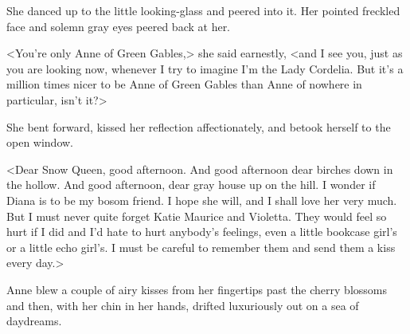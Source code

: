 She danced up to the little looking-glass and peered into it. Her pointed freckled face and solemn gray eyes peered back at her.

<You're only Anne of Green Gables,> she said earnestly, <and I see you, just as you are looking now, whenever I try to imagine I'm the Lady Cordelia. But it's a million times nicer to be Anne of Green Gables than Anne of nowhere in particular, isn't it?>

She bent forward, kissed her reflection affectionately, and betook herself to the open window.

<Dear Snow Queen, good afternoon. And good afternoon dear birches down in the hollow. And good afternoon, dear gray house up on the hill. I wonder if Diana is to be my bosom friend. I hope she will, and I shall love her very much. But I must never quite forget Katie Maurice and Violetta. They would feel so hurt if I did and I'd hate to hurt anybody's feelings, even a little bookcase girl's or a little echo girl's. I must be careful to remember them and send them a kiss every day.>

Anne blew a couple of airy kisses from her fingertips past the cherry blossoms and then, with her chin in her hands, drifted luxuriously out on a sea of daydreams.